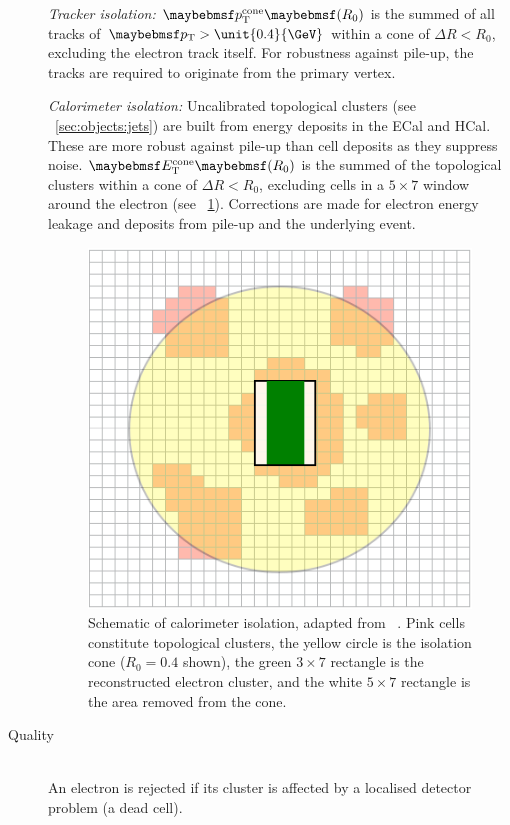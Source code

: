 \begin{description}
	\textit{Tracker isolation:} $\ptcone{R_0}$ is the summed \pt of all tracks of 
	$\pt > \unit{0.4}{\GeV}$ within a cone of $\Delta R < R_0$, excluding the electron 
	track itself. For robustness against pile-up, the tracks are required to originate 
	from the primary vertex.

	\textit{Calorimeter isolation:} Uncalibrated topological clusters (see 
	\Section~\ref{sec:objects:jets}) are built from energy deposits in the ECal 
	and HCal. These are more robust against pile-up than cell deposits as they 
	suppress noise. $\etcone{R_0}$ is the summed \et of the topological clusters within a 
	cone of $\Delta R < R_0$, excluding cells in a $5 \times 7$ window around the 
	electron (see \Figure~\ref{fig:objects:el_iso}). Corrections are made for electron 
	energy leakage and deposits from pile-up and the underlying event.

	\begin{figure}[t]
		\includegraphics[width=0.8\smallfigwidth]{tex/selection/el_isolation}
		\caption{Schematic of calorimeter isolation, adapted from 
		\Reference~\cite{ATLAS:isolation}. Pink cells constitute topological 
		clusters, the yellow circle is the isolation cone ($R_0 = 0.4$ shown), the green 
		$3 \times 7$ rectangle is the reconstructed electron cluster, and the white 
		$5 \times 7$ rectangle is the area removed from the cone.}
		\label{fig:objects:el_iso}
	\end{figure}

\item[Quality] \hfill \\
	An electron is rejected if its cluster is affected by a localised detector problem 
	(\eg a dead cell).


\end{description}
